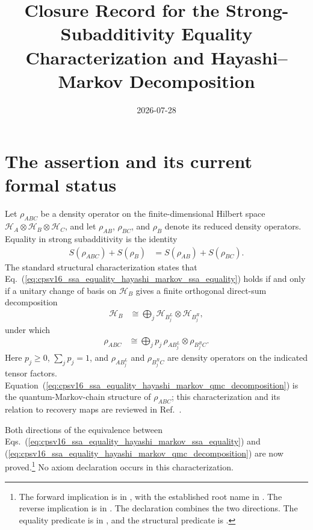 \documentclass[11pt]{article}
\title{Closure Record for the Strong-Subadditivity Equality
Characterization and Hayashi--Markov Decomposition}
\author{}
\date{2026-07-28}
\begin{document}
\maketitle
{}

\section{The assertion and its current formal status}

Let $\rho_{ABC}$ be a density operator on the finite-dimensional Hilbert space
$\mathcal H_A\otimes\mathcal H_B\otimes\mathcal H_C$, and let
$\rho_{AB}$, $\rho_{BC}$, and $\rho_B$ denote its reduced density operators.
Equality in strong subadditivity is the identity
\begin{align}
    S(\rho_{ABC})+S(\rho_B)
        &=S(\rho_{AB})+S(\rho_{BC}).
    \label{eq:cpsv16_ssa_equality_hayashi_markov_ssa_equality}
\end{align}
The standard structural characterization states that
Eq.~(\ref{eq:cpsv16_ssa_equality_hayashi_markov_ssa_equality}) holds if and
only if a unitary change of basis on $\mathcal H_B$ gives a finite orthogonal
direct-sum decomposition
\begin{align}
    \mathcal H_B
        &\cong\bigoplus_j
        \mathcal H_{B_j^L}\otimes\mathcal H_{B_j^R},
    \label{eq:cpsv16_ssa_equality_hayashi_markov_middle_decomposition}
\end{align}
under which
\begin{align}
    \rho_{ABC}
        &\cong\bigoplus_j
        p_j\,\rho_{AB_j^L}\otimes\rho_{B_j^RC}.
    \label{eq:cpsv16_ssa_equality_hayashi_markov_qmc_decomposition}
\end{align}
Here $p_j\geq 0$, $\sum_jp_j=1$, and $\rho_{AB_j^L}$ and
$\rho_{B_j^RC}$ are density operators on the indicated tensor factors.
Equation~(\ref{eq:cpsv16_ssa_equality_hayashi_markov_qmc_decomposition}) is
the quantum-Markov-chain structure of $\rho_{ABC}$; this characterization and
its relation to recovery maps are reviewed in Ref.~\cite{Cirac2021Matrix}.

Both directions of the equivalence between
Eqs.~(\ref{eq:cpsv16_ssa_equality_hayashi_markov_ssa_equality}) and
(\ref{eq:cpsv16_ssa_equality_hayashi_markov_qmc_decomposition}) are now
proved.\footnote{The forward implication is
 in
, with the established root
name  in
. The reverse implication
is  in
. The declaration
 combines the two directions.
The equality predicate is  in
, and the structural predicate is
.}
No axiom declaration occurs in this characterization.
\end{document}

